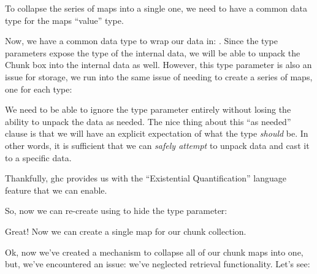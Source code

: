 To collapse the series of maps into a single one, we need to have a common data
type for the maps ``value'' type. 

\badUniversalChunkCarriage{}

Now, we have a common data type to wrap our data in: \Chunk{}. Since the type
parameters expose the type of the internal data, we will be able to unpack the
Chunk box into the internal data as well. However, this type parameter is also
an issue for storage, we run into the same issue of needing to create a series
of maps, one for each type:

\showingBadChunkWouldFailChunkDB{}

We need to be able to ignore the type parameter entirely without losing the
ability to unpack the data as needed. The nice thing about this ``as needed''
clause is that we will have an explicit expectation of what the type
\textit{should} be. In other words, it is sufficient that we can \textit{safely
attempt} to unpack data and cast it to a specific data.

Thankfully, \acs{ghc} provides us with the ``Existential Quantification''
language feature that we can enable.

So, now we can re-create \Chunk{} using \ExistentialQuantification{} to hide the
type parameter:


\voidDataChunks{}

Great! Now we can create a single map for our chunk collection.

\voidDataChunkDB{}

Ok, now we've created a mechanism to collapse all of our chunk maps into one,
but, we've encountered an issue: we've neglected retrieval functionality. Let's
see:

